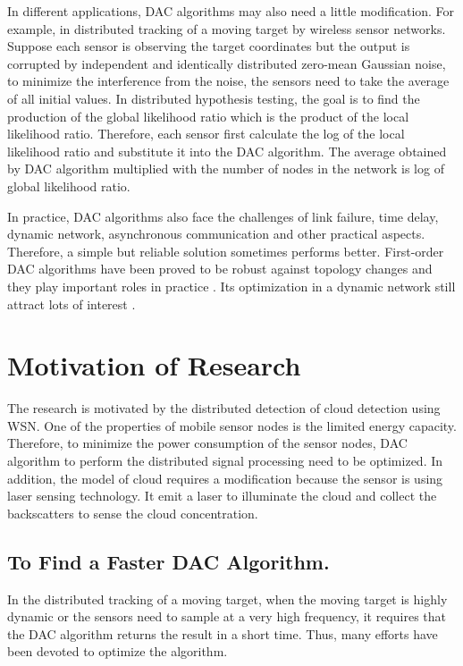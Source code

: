 In different applications, DAC algorithms may also need a little modification.
For example, in distributed tracking of a moving target by wireless
sensor networks. Suppose each sensor is observing the target coordinates
but the output is corrupted by independent and identically distributed
zero-mean Gaussian noise, to minimize the interference from the noise,
the sensors need to take the average of all initial values. In distributed
hypothesis testing, the goal is to find the production of the global
likelihood ratio which is the product of the local likelihood ratio.
Therefore, each sensor first calculate the log of the local likelihood
ratio and substitute it into the DAC algorithm. The average obtained
by DAC algorithm multiplied with the number of nodes in the network
is log of global likelihood ratio.

In practice, DAC algorithms also face the challenges of link failure,
time delay, dynamic network, asynchronous communication and other
practical aspects. Therefore, a simple but reliable solution sometimes
performs better. First-order DAC algorithms have been proved to be
robust against  topology changes and they play important roles in
practice \cite{Ren2007}. Its optimization in a dynamic network still
attract lots of interest \cite{Jakovetic2010}\cite{Nedic2010}. 


\section{Motivation of Research }

The research is motivated by the distributed detection of cloud detection
using WSN. One of the properties of mobile sensor nodes is the limited
energy capacity. Therefore, to minimize the power consumption of the
sensor nodes, DAC algorithm to perform the distributed signal processing
need to be optimized. In addition, the model of cloud requires a modification
because the sensor is using laser sensing technology. It emit a laser
to illuminate the cloud and collect the backscatters to sense the
cloud concentration.


\subsection{To Find a Faster DAC Algorithm. }

  

In the distributed tracking of a moving target, when the moving target
is highly dynamic or the sensors need to sample at a very high frequency,
it requires that the DAC algorithm returns the result in a short time.
Thus, many efforts have been devoted to optimize the algorithm. 

